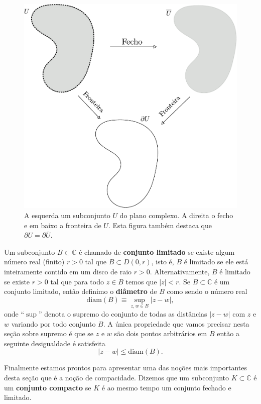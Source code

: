 \begin{figure}
\centering
\includegraphics[width=0.7\linewidth]{Figuras/fecho-fronteira}
\caption{A esquerda um subconjunto $U$ do plano complexo. A direita o fecho e em baixo a fronteira de $U$.
Esta figura também destaca que $\partial U = \partial \overline{U}$.}
\label{fig:fecho-fronteira}
\end{figure}


\medskip 
Um subconjunto $B\subset \mathbb{C}$ é chamado de {\bf conjunto limitado} 
se existe algum número real (finito) $r>0$ tal que 
$B\subset D(0,r)$, isto é, $B$ é limitado se ele está inteiramente contido em um disco de raio
$r>0$. Alternativamente, $B$ é limitado se existe $r>0$ tal que 
para todo $z\in B$ temos que  $|z|<r$. Se $B\subset \mathbb{C}$ é um conjunto limitado,
então definimo o {\bf diâmetro} de $B$ como sendo o número real 
\[
\mathrm{diam}(B) \equiv \sup_{z,w\in B}|z-w|,
\] 
onde ``$\sup$'' denota o supremo do conjunto de todas as distâncias $|z-w|$ com $z$ e $w$
variando por todo conjunto $B$. A única propriedade que vamos precisar nesta seção sobre
supremo é que se $z$ e $w$ são dois pontos arbitrários em $B$ então a seguinte desigualdade é satisfeita
\[
|z-w|\leqslant \mathrm{diam}(B).
\]


\medskip

Finalmente estamos prontos para apresentar uma das noções mais importantes desta seção
que é a noção de compacidade. Dizemos que um subconjunto $K\subset \mathbb{C}$ é um 
{\bf conjunto compacto} se $K$ é ao mesmo tempo um conjunto 
fechado e limitado. 


